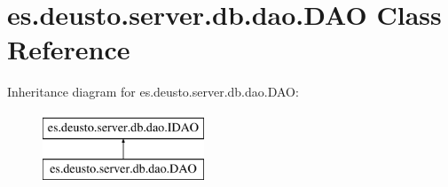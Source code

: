 \hypertarget{classes_1_1deusto_1_1server_1_1db_1_1dao_1_1_d_a_o}{}\section{es.\+deusto.\+server.\+db.\+dao.\+D\+AO Class Reference}
\label{classes_1_1deusto_1_1server_1_1db_1_1dao_1_1_d_a_o}
Inheritance diagram for es.\+deusto.\+server.\+db.\+dao.\+D\+AO\+:\begin{figure}[H]
\begin{center}
\leavevmode
\includegraphics[height=2.000000cm]{classes_1_1deusto_1_1server_1_1db_1_1dao_1_1_d_a_o}
\end{center}
\end{figure}
